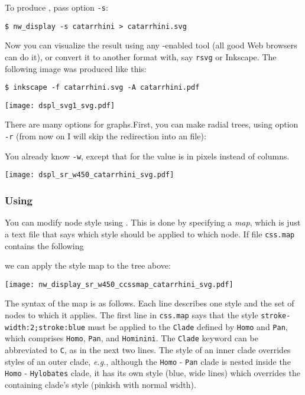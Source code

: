 To produce \svg, pass option \texttt{-s}:
\begin{verbatim}
$ nw_display -s catarrhini > catarrhini.svg
\end{verbatim}

Now you can visualize the result using any \svg-enabled tool (all good Web browsers can do it), or convert it to another format with, say \texttt{rsvg} or Inkscape. The following image was produced like this:

\begin{verbatim}
$ inkscape -f catarrhini.svg -A catarrhini.pdf
\end{verbatim}

\begin{center}
 \texttt{[image: dspl\_svg1\_svg.pdf]}
\end{center}

There are many options for \svg{} graphs.First, you can make radial trees, using option \texttt{-r} (from now on I will skip the redirection into an \svg{} file):



You already know \texttt{-w}, except that for \svg{} the value is in pixels instead of columns. 

\begin{center}
\texttt{[image: dspl\_sr\_w450\_catarrhini\_svg.pdf]}
\end{center}

\subsubsection{Using \css}
\label{sct_display_svg_css}

You can modify node style using \css. This is done by specifying a \textit{\css{} map}, which is just a text file that says which style should be applied to which node. If file \texttt{css.map} contains the following
\begin{quote}
 
\end{quote} 
we can apply the style map to the tree above:



\begin{center}
 \texttt{[image: nw\_display\_sr\_w450\_ccssmap\_catarrhini\_svg.pdf]}
\end{center}

The syntax of the \css{} map is as follows. Each line describes one style and the set of nodes to which it applies. The first line in \texttt{css.map} says that the style \texttt{stroke-width:2;stroke:blue} must be applied to the \texttt{Clade} defined by \texttt{Homo} and \texttt{Pan}, which comprises \texttt{Homo}, \texttt{Pan}, and \texttt{Hominini}. The \texttt{Clade} keyword can be abbreviated to \texttt{C}, as in the next two lines. The style of an inner clade overrides styles of an outer clade, \textit{e.g.}, although the \texttt{Homo} - \texttt{Pan} clade is nested inside the \texttt{Homo} - \texttt{Hylobates} clade, it has its own style (blue, wide lines) which overrides the containing clade's style (pinkish with normal width).

